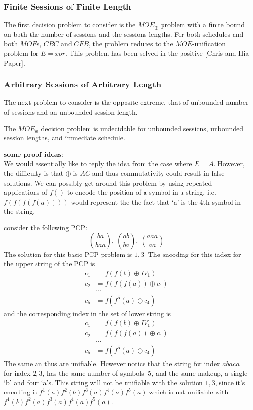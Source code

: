 \documentclass{llncs}
\begin{document}
\subsubsection{Finite Sessions of Finite Length}
The first decision problem to consider is the $MOE_{\oplus}$
problem with a finite bound on both the number of sessions and
the sessions lengths. 
For both schedules and both $MOE$s, $CBC$ and $CFB$, the problem
reduces to the $MOE$-unification problem for $E=xor$. This problem
has been solved in the positive [Chris and Hia Paper].

\subsubsection{Arbitrary Sessions of Arbitrary Length}
The next problem to consider is the opposite extreme, that of unbounded
number of sessions and an unbounded session length. 

\begin{conjecture}
The $MOE_{\oplus}$ decision problem is undecidable for unbounded 
sessions, unbounded session lengths, and immediate schedule. 
\end{conjecture}

\noindent
\textbf{some proof ideas}:\\
We would essentially like to reply the idea from the case where 
$E = A$. However, the difficulty is that $\oplus$ is $AC$ and thus
commutativity could result in false solutions. We can possibly 
get around this problem by using repeated applications of $f()$
to encode the position of a symbol in a string, i.e., 
$f(f(f(f(a))))$ would represent the the fact that `a' is the 
4th symbol in the string. 

\begin{example}
	consider the following PCP:
	\[
	(\frac{ba}{baa}),~(\frac{ab}{ba}),~(\frac{aaa}{aa})
	\]
	The solution for this basic PCP problem is $1,3$.
	The encoding for this index for the upper string of the PCP is
	\begin{align}
		c_1 &= f(f(b) \oplus IV_{1})\\
		c_2 &= f(f(f(a)) \oplus c_1)\\
		&\ldots\\
		c_5 &= f(f^5(a) \oplus c_4)
	\end{align}
	and the corresponding index in the set of lower string is
	\begin{align}
	c_1 &= f(f(b) \oplus IV_{1})\\
	c_2 &= f(f(f(a)) \oplus c_1)\\
	&\ldots\\
	c_5 &= f(f^5(a) \oplus c_4)
	\end{align}
	The same an thus are unifiable. However notice that the string 
	for index $abaaa$ for index $2,3$, has the same number of symbols,
	5, and the same makeup, a single `b' and four `a's. This string will not be unifiable with the solution $1,3$, since it's
	encoding is $f^1(a)f^2(b)f^3(a)f^4(a)f^5(a)$ which is not
	unifiable with $f^1(b)f^2(a)f^3(a)f^4(a)f^5(a)$. 
\end{example}
\end{document}
